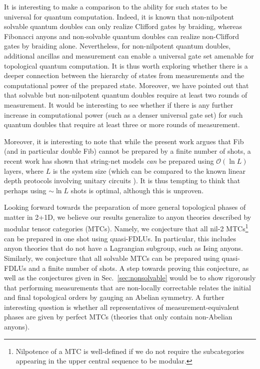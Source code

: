 \documentclass[nofootinbib,prx,twocolumn,showpacs,superscriptaddress,notitlepage,amsmath,amssymb]{revtex4-2}
\theoremstyle{definition}
\begin{document}
It is interesting to make a comparison to the ability for such states to be universal for quantum computation. Indeed, it is known that non-nilpotent solvable quantum doubles can only realize Clifford gates by braiding, whereas Fibonacci anyons and non-solvable quantum doubles can realize non-Clifford gates by braiding alone. Nevertheless, for non-nilpotent quantum doubles,  additional ancillas and measurement can enable a universal gate set amenable for topological quantum computation\cite{OgburnPreskill99,Kitaev_2003,Mochon04}. It is thus worth exploring whether there is a deeper connection between the hierarchy of states from measurements and the computational power of the prepared state. Moreover, we have pointed out that that solvable but non-nilpotent quantum doubles require at least two rounds of measurement. It would be interesting to see whether if there is any further increase in computational power (such as a denser universal gate set) for such quantum doubles that require at least three or more rounds of measurement.

Moreover, it is interesting to note that while the present work argues that Fib (and in particular double Fib) cannot be prepared by a finite number of shots, a recent work has shown that string-net models \emph{can} be prepared using $\mathcal O( \ln L)$ layers, where $L$ is the system size \cite{Lu2022} (which can be compared to the known linear depth protocols involving unitary circuits \cite{Liu21}). It is thus tempting to think that perhaps using $\sim \ln L$ shots is optimal, although this is unproven.

Looking forward towards the preparation of more general topological phases of matter in 2+1D, we believe our results generalize to anyon theories described by modular tensor categories (MTCs). Namely, we conjecture that all nil-2 MTCs\footnote{Nilpotence of a MTC is well-defined if we do not require the subcategories appearing in the upper central sequence to be modular.} \cite{GelakiNikshych08} can be prepared in one shot using quasi-FDLUs. In particular, this includes anyon theories that do not have a Lagrangian subgroup, such as Ising anyons. Similarly, we conjecture that all solvable MTCs \cite{Etingof2011weakly} can be prepared using quasi-FDLUs and a finite number of shots. A step towards proving this conjecture, as well as the conjectures given in Sec.~\ref{sec:nonsolvable} would be to show rigorously that performing measurements that are non-locally correctable relates the initial and final topological orders by gauging an Abelian symmetry. A further interesting question is whether all representatives of measurement-equivalent phases are given by perfect MTCs (theories that only contain non-Abelian anyons).
\end{document}
